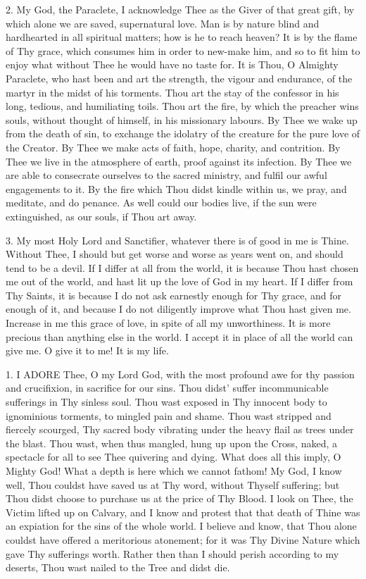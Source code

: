 2. My God, the Paraclete, I
acknowledge Thee as the Giver of that great gift, by which alone we are
saved, supernatural love. Man is by nature blind and hardhearted in all
spiritual matters; how is he to reach heaven? It is by the flame of Thy
grace, which consumes him in order to new-make him, and so to fit him to
enjoy what without Thee he would have no taste for. It is Thou, O
Almighty Paraclete, who hast been and art the strength, the vigour and
endurance, of the martyr in the midst of his torments. Thou art the stay
of the confessor in his long, tedious, and humiliating toils. Thou art
the fire, by which the preacher wins souls, without thought of himself,
in his missionary labours. By Thee we wake up from the death of sin, to
exchange the idolatry of the creature for the pure love of the Creator.
By Thee we make acts of faith, hope, charity, and contrition. By Thee we
live in the atmosphere of earth, proof against its infection. By Thee we
are able to consecrate ourselves to the sacred ministry, and fulfil our
awful engagements to it. By the fire which Thou didst kindle within us,
we pray, and meditate, and do penance. As well could our bodies live, if
the sun were extinguished, as our souls, if Thou art away.

3. My most Holy Lord and
Sanctifier, whatever there is of good in me is Thine. Without Thee, I
should but get worse and worse as years went on, and should tend
to be a devil. If I differ at all from the world, it is because Thou
hast chosen me out of the world, and hast lit up the love of God in my
heart. If I differ from Thy Saints, it is because I do not ask earnestly
enough for Thy grace, and for enough of it, and because I do not
diligently improve what Thou hast given me. Increase in me this grace of
love, in spite of all my unworthiness. It is more precious than anything
else in the world. I accept it in place of all the world can give me. O
give it to me! It is my life.



1. I ADORE
Thee, O my Lord God, with the most profound awe for thy passion and
crucifixion, in sacrifice for our sins. Thou didst' suffer
incommunicable sufferings in Thy sinless soul. Thou wast exposed in Thy
innocent body to ignominious torments, to mingled pain and shame. Thou
wast stripped and fiercely scourged, Thy sacred body vibrating under the
heavy flail as trees under the blast. Thou wast, when thus mangled, hung
up upon the Cross, naked, a spectacle for all to see Thee quivering and
dying. What does all this imply, O Mighty God! What a depth is here
which we cannot fathom! My God, I know well, Thou couldst have saved us
at Thy word, without Thyself suffering; but Thou didst choose to
purchase us at the price of Thy Blood. I look on Thee, the Victim lifted
up on Calvary, and I know and protest that that death of Thine was an
expiation for the sins of the whole world. I believe and know, that Thou
alone couldst have offered a meritorious atonement; for it was Thy
Divine Nature which gave Thy sufferings worth. Rather then than I
should perish according to my deserts, Thou wast nailed to the Tree and
didst die.


